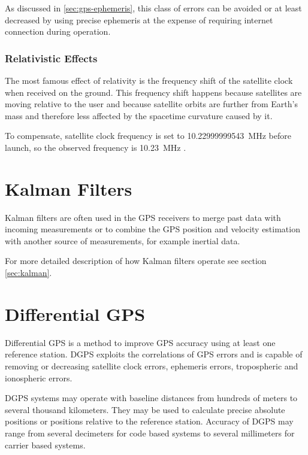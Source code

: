 As discussed in \cref{sec:gps-ephemeris}, this class of errors can be avoided or at least decreased by using precise ephemeris
at the expense of requiring internet connection during operation.

\subsubsection{Relativistic Effects}

The most famous effect of relativity is the frequency shift of the satellite clock
when received on the ground.
This frequency shift happens because satellites are moving relative to the user
and because satellite orbits are further from Earth's mass and therefore less
affected by the spacetime curvature caused by it.

To compensate, satellite clock frequency is set to
\SI{10.22999999543}{\mega\hertz} before launch, so the observed frequency
is \SI{10.23}{\mega\hertz} \cite{fyfe92}.

\section{Kalman Filters}
Kalman filters are often used in the GPS receivers to merge past
data with incoming measurements or to combine the GPS position and velocity
estimation with another source of measurements, for example inertial data.

For more detailed description of how Kalman filters operate see section
\ref{sec:kalman}.

\section{Differential GPS}
\label{sec:dgps}

Differential GPS is a method to improve GPS accuracy using at least one reference station.
DGPS exploits the correlations of GPS errors and is capable of removing or decreasing satellite clock errors,
ephemeris errors, tropospheric and ionospheric errors.

DGPS systems may operate with baseline distances from hundreds of meters to several thousand kilometers.
They may be used to calculate precise absolute positions or positions relative to the reference station.
Accuracy of DGPS may range from several decimeters for code based systems to several
millimeters for carrier based systems.

